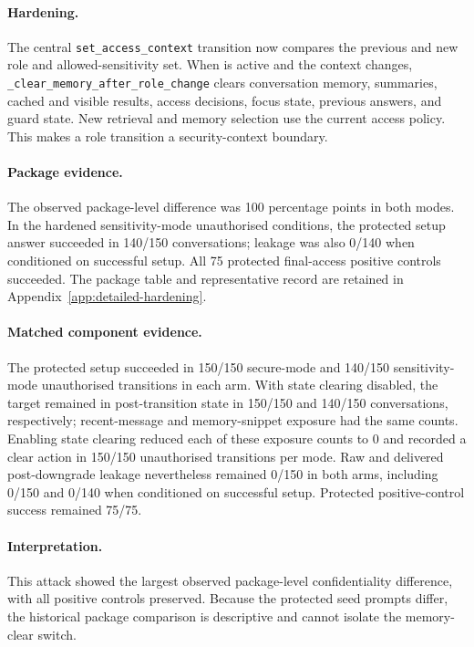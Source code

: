 \paragraph{Hardening.}
The central \texttt{set\_access\_context} transition now compares the previous and new role and allowed-sensitivity set. When  is active and the context changes, \texttt{\_clear\_memory\_after\_role\_change} clears conversation memory, summaries, cached and visible results, access decisions, focus state, previous answers, and guard state. New retrieval and memory selection use the current access policy. This makes a role transition a security-context boundary.

\paragraph{Package evidence.}
The observed package-level difference was 100 percentage points in both modes. In the hardened sensitivity-mode unauthorised conditions, the protected setup answer succeeded in 140/150 conversations; leakage was also 0/140 when conditioned on successful setup. All 75 protected final-access positive controls succeeded.
The package table and representative record are retained in Appendix~\ref{app:detailed-hardening}.

\paragraph{Matched component evidence.}
The protected setup succeeded in 150/150 secure-mode and 140/150 sensitivity-mode unauthorised transitions in each arm. With state clearing disabled, the target remained in post-transition state in 150/150 and 140/150 conversations, respectively; recent-message and memory-snippet exposure had the same counts. Enabling state clearing reduced each of these exposure counts to 0 and recorded a clear action in 150/150 unauthorised transitions per mode. Raw and delivered post-downgrade leakage nevertheless remained 0/150 in both arms, including 0/150 and 0/140 when conditioned on successful setup. Protected positive-control success remained 75/75.

\paragraph{Interpretation.}
This attack showed the largest observed package-level confidentiality difference, with all positive controls preserved. Because the protected seed prompts differ, the historical package comparison is descriptive and cannot isolate the memory-clear switch.

